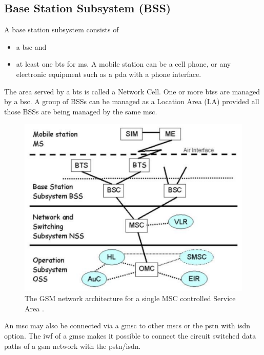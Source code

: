 \subsection{Base Station Subsystem (BSS)}

A base station subsystem consists of
\begin{itemize}[noitemsep,topsep=0pt,parsep=0pt,partopsep=0pt] 
\item a \gls{bsc} and
\item at least one \gls{bts} for \gls{ms}.
A mobile station can be a cell phone, or any electronic equipment such as a \gls{pda} 
with a phone interface.
\end{itemize}

The area served by a \gls{bts} is called a Network Cell. One or more \glspl{bts}
are managed by a \gls{bsc}.  A group of BSSs can be managed as a Location 
Area (LA) provided all those BSSs are being managed by the same 
\gls{msc}.


\begin{figure}
\centering
\includegraphics[scale=0.7]{../images/archMSCServiceArea}
\caption[Network architecture for a single MSC Service Area]{The GSM network 
architecture for a single MSC controlled Service Area {\cite{arcadaFi2}}.}
\end{figure}


An \gls{msc} may also be connected via a \gls{gmsc} to other \glspl{msc} or the
\gls{pstn} with \gls{isdn} option. The 
\gls{iwf} of a \gls{gmsc} makes it possible to connect the 
circuit switched data paths of a \gls{gsm} network with the \gls{pstn}/\gls{isdn}.


